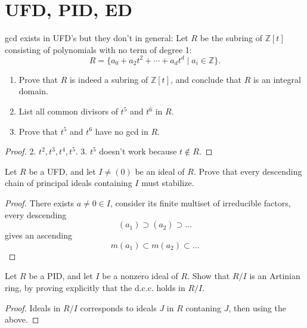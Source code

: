 \documentclass[openany]{book}
\begin{document}
\section{UFD, PID, ED}

\begin{prob}[2.5]
    gcd exists in UFD's but they don't in general:
    Let \( R \) be the subring of \( \mathbb{Z}[t] \) consisting of polynomials with no term of degree 1:
\[
R = \{a_0 + a_2 t^2 + \cdots + a_d t^d \mid a_i \in \mathbb{Z}\}.
\]

\begin{enumerate}
    \item Prove that \( R \) is indeed a subring of \( \mathbb{Z}[t] \), and conclude that \( R \) is an integral domain.
    \item List all common divisors of \( t^5 \) and \( t^6 \) in \( R \).
    \item Prove that \( t^5 \) and \( t^6 \) have no gcd in \( R \).
\end{enumerate}
\end{prob}
\begin{proof}
    2. $t^2, t^3, t^4, t^5$. 3. $t^5$ doesn't work because $t\not\in R$.
\end{proof}


\begin{prob}[2.8]
    Let \( R \) be a UFD, and let \( I \neq (0) \) be an ideal of \( R \). Prove that every descending chain of principal ideals containing \( I \) must stabilize.
\end{prob}
\begin{proof}
    There exists $a\neq 0\in I$, consider its finite multiset of irreducible factors, every descending 
    \begin{equation*}
        (a_1)\supset(a_2)\supset\dots
    \end{equation*}
    gives an ascending 
    \begin{equation*}
        m(a_1)\subset m(a_2)\subset\dots
    \end{equation*}
\end{proof}

\begin{prob}[2.11]
    Let \( R \) be a PID, and let \( I \) be a nonzero ideal of \( R \). Show that \( R/I \) is an Artinian ring, by proving explicitly that the d.c.c. holds in \( R/I \).
\end{prob}
\begin{proof}
    Ideals in $R/I$ corresponds to ideals $J$ in $R$ contaning $J$, then using the above.
\end{proof}
\end{document}
